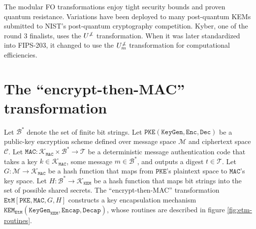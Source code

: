 \documentclass[floatrow,journal=tches,submission]{iacrtrans}
\newcommand{\pke}{\texttt{PKE}}
\newcommand{\keygen}{\texttt{KeyGen}}
\newcommand{\encrypt}{\texttt{Enc}}
\newcommand{\decrypt}{\texttt{Dec}}
\newcommand{\kem}{\texttt{KEM}}
\newcommand{\encap}{\texttt{Encap}}
\newcommand{\decap}{\texttt{Decap}}
\newcommand{\etm}{\texttt{EtM}}  %
\newcommand{\mac}{\texttt{MAC}}
\begin{document}
The modular FO transformations enjoy tight security bounds and proven quantum resistance. Variations have been deployed to many post-quantum KEMs submitted to NIST's post-quantum cryptography competition. Kyber, one of the round 3 finalists, uses the $U^{\not\bot}$ transformation. When it was later standardized into FIPS-203, it changed to use the $U^{\not\bot}_m$ transformation for computational efficiencies.

\section{The ``encrypt-then-MAC'' transformation}\label{sec:main-results}
Let $\mathcal{B}^\ast$ denote the set of finite bit strings. Let $\pke(\keygen, \encrypt, \decrypt)$ be a public-key encryption scheme defined over message space $\mathcal{M}$ and ciphertext space $\mathcal{C}$. Let $\mac: \mathcal{K}_\mac \times \mathcal{B}^\ast \rightarrow \mathcal{T}$ be a deterministic message authentication code that takes a key $k \in \mathcal{K}_\mac$, some message $m \in \mathcal{B}^\ast$, and outputs a digest $t \in \mathcal{T}$. Let $G: \mathcal{M} \rightarrow \mathcal{K}_\mac$ be a hash function that maps from $\pke$'s plaintext space to $\mac$'s key space. Let $H: \mathcal{B}^\ast \rightarrow \mathcal{K}_\kem$ be a hash function that maps bit strings into the set of possible shared secrets. The ``encrypt-then-MAC'' transformation $\etm[\pke, \mac, G, H]$ constructs a key encapsulation mechanism $\kem_\etm(\keygen_\kem, \encap, \decap)$, whose routines are described in figure \ref{fig:etm-routines}.
\end{document}
